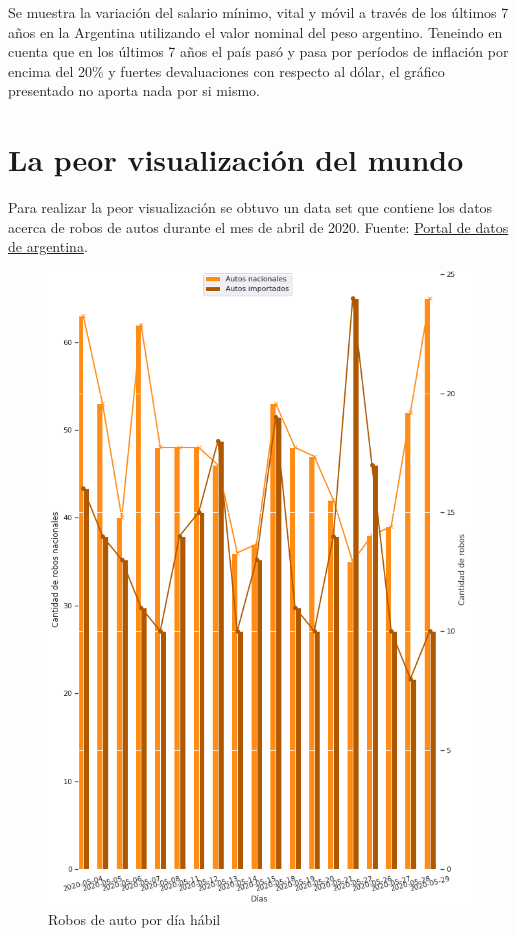 \documentclass[
	12pt, %
	spanish, %
]{fphw}
\begin{document}
Se muestra la variación del salario mínimo, vital y móvil a través de los últimos 7 años en la Argentina utilizando el valor nominal del peso argentino. Teneindo en cuenta que en los últimos 7 años el país pasó y pasa por períodos de inflación por encima del 20\% y fuertes devaluaciones con respecto al dólar, el gráfico presentado no aporta nada por si mismo.

\newpage

\section*{La peor visualización del mundo}

Para realizar la peor visualización se obtuvo un data set que contiene los datos acerca de robos de autos durante el mes de abril de 2020. Fuente: \href{https://datos.gob.ar/dataset/justicia-robos-recuperos-autos/archivo/justicia_c46fe6e0-6d29-4427-907e-d37c0d7c32c4}{Portal de datos de argentina}.

\begin{figure}[ht]
\begin{center}
	\includegraphics[width=0.7\columnwidth,keepaspectratio]{peor_grafica-mod.png}
	\caption*{Robos de auto por día hábil}
\end{center}
\end{figure}
\end{document}
